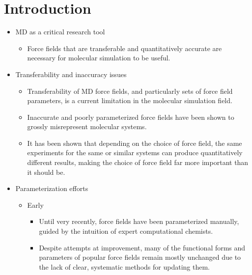 \documentclass[aps,pre,nofootinbib,superscriptaddress,linenumbers,10pt, draft,tightenlines]{revtex4-1}
\begin{document}
\section{Introduction}
\begin{itemize}
	\item MD as a critical research tool
	\begin{itemize}
		\item Force fields that are transferable and quantitatively accurate are necessary for molecular simulation to be useful. \cite{villin,villin2,drug_discov}
	\end{itemize}
    \item Transferability and inaccuracy issues
    \begin{itemize}
    	\item Transferability of MD force fields, and particularly sets of force field parameters, is a current limitation 
    	      in the molecular simulation field.\cite{transferability1,transferability2,
    	      transferability3,transferability4}  
        \item Inaccurate and poorly parameterized force fields have been shown to grossly misrepresent molecular systems.
              \cite{ffcomp1,ffcomp2,robustness} 
        \item It has been shown that depending on the choice of force field, the same experiments for the same or similar systems can produce quantitatively
              different results, making the choice of force field far more important than it should be. \cite{ffcomp1,ffcomp2,ewen_comparison_2016,petrov_are_2014,guvench_comparison_2008}\\
    \end{itemize}
	\item Parameterization efforts
	\begin{itemize}
		\item Early 
		\begin{itemize}
			\item Until very recently, force fields have been parameterized manually, guided by the intuition of expert computational
			      chemists.\cite{parm94,tip3p,burger,law,combined,rational,aipar,charmm1,charmm2,mm1,mm2,mmff}
			\item Despite attempts at improvement, many of the functional forms and parameters of popular force fields remain mostly 
			      unchanged due to the lack of clear, systematic methods for updating them.\cite{unchanged,monticelli}

\end{itemize}
\end{itemize}
\end{itemize}
\end{document}

